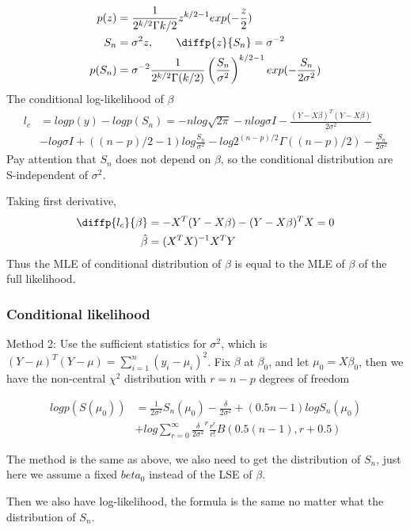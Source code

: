 \documentclass[11pt]{article} %
\begin{document}
\begin{align*}
	p(z) &= \frac{1}{2^{k/2} \Gamma{k/2}} z^{k/2-1} exp(-\frac{z}{2})  \\
	S_n &= \sigma^2 z, \qquad \diffp{z}{{S_n}} = \sigma^{-2} \\
	p(S_n) &= \sigma^{-2} \frac{1}{2^{k/2} \Gamma{(k/2)} } \left(\frac{S_n}{\sigma^2}\right) ^{k/2-1} exp(-\frac{S_n}{2 \sigma^2 })
\end{align*}
The conditional log-likelihood of $\beta$ 	
\begin{align*}
	l_c &= log p(y) - log p(S_n) = - n log \sqrt{2\pi} -n log \sigma I - \frac{(Y- X \beta)^T (Y- X\beta)}{2 \sigma^2} \\
	& - log \sigma I + ((n-p)/2-1) log \frac{S_n}{\sigma^2} - log 2^{(n-p)/2} \Gamma{((n-p)/2)} -  \frac{S_n}{2 \sigma^2 }
\end{align*}
Pay attention that $S_n$ does not depend on $\beta$, so the conditional distribution are S-independent of $\sigma^2$.

Taking first derivative, 
\begin{align*}
	\diffp{l_c}{\beta} &=- X^T(Y- X\beta) - (Y- X\beta)^T X = 0\\
	\hat{\beta} &= (X^TX)^{-1}X^T Y
\end{align*}
Thus the MLE of conditional distribution of $\beta$ is equal to the MLE of $\beta$ of the full likelihood.

\subsubsection{Conditional likelihood}
Method 2: Use the sufficient statistics for $\sigma^2$, which is $ (Y-\mu)^T (Y-\mu) = \sum_{i=1}^n (y_i- \mu_i)^2 $. Fix $\beta$ at $\beta_0$, and let $\mu_0 = X \beta_0$, then we have the non-central $\chi^2$ distribution with $r = n-p$ degrees of freedom  

\begin{align*}
	log p(S(\mu_0)) &= \frac{1}{2\sigma^2} S_n(\mu_0) - \frac{\delta}{2\sigma^2} + (0.5n -1) log S_n(\mu_0) \\
	& +	log \sum_{r=0}^{\infty} \frac{\delta}{2 \sigma^2}^r \frac{r^r}{r!} B(0.5(n-1), r + 0.5)
\end{align*}

The method is the same as above, we also need to get the distribution of $S_n$, just here we assume a fixed $beta_0$ instead of the LSE of $\beta$.


Then we also have log-likelihood, the formula is the same no matter what the distribution of $S_n$.
\end{document}
